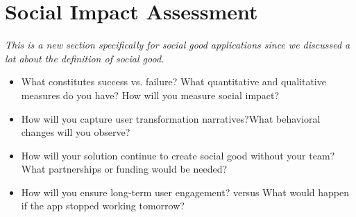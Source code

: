 \section{Social Impact Assessment}
\emph{This is a new section specifically for social good applications since we discussed a lot about the definition of social good.}

\begin{itemize}
    \item What constitutes success vs. failure? What quantitative and qualitative measures do you have? How will you measure social impact?
    \item How will you capture user transformation narratives?What behavioral changes will you observe?
    \item How will your solution continue to create social good without your team? What partnerships or funding would be needed?
    \item How will you ensure long-term user engagement? versus What would happen if the app stopped working tomorrow?
\end{itemize}